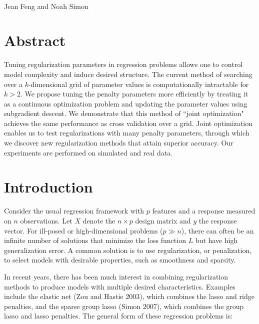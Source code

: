 \documentclass[10pt,letterpaper]{article}
\date{}
\begin{document}
\vspace*{0.35in}

\begin{flushleft}
{\Large
\textbf{}
}
\newline
\\
Jean Feng and Noah Simon
\\

\end{flushleft}
\section*{Abstract}
Tuning regularization parameters in regression problems allows one to control model complexity and induce desired structure. The current method of searching over a $k$-dimensional grid of parameter values is computationally intractable for $k>2$. We propose tuning the penalty parameters more efficiently by treating it as a continuous optimization problem and updating the parameter values using subgradient descent. We demonstrate that this method of ``joint optimization" achieves the same performance as cross validation over a grid. Joint optimization enables us to test regularizations with many penalty parameters, through which we discover new regularization methods that attain superior accuracy. Our experiments are performed on simulated and real data.

\section{Introduction}

Consider the usual regression framework with $p$ features and a response measured on $n$ observations. Let $X$ denote the $n \times p$ design matrix and $y$ the response vector. For ill-posed or high-dimensional problems ($p \gg n$), there can often be an infinite number of solutions that minimize the loss function $L$ but have high generalization error. A common solution is to use regularization, or penalization, to select models with desirable properties, such as smoothness and sparsity.

In recent years, there has been much interest in combining regularization methods to produce models with multiple desired characteristics. Examples include the elastic net (Zou and Hastie 2003), which combines the lasso and ridge penalties, and the sparse group lasso (Simon 2007), which combines the group lasso and lasso penalties. The general form of these regression problems is:
\end{document}
